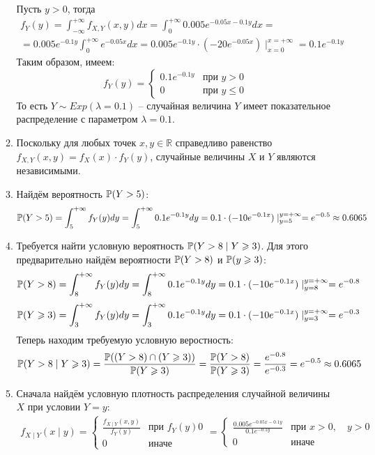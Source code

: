 \documentclass[12pt, a4paper]{article}\usepackage[]{graphicx}\usepackage[]{color}
\begin{document}
\begin{enumerate}
\begin{enumerate}
	Пусть $y > 0 $, тогда
	\begin{multline*}
	f_Y (y) = \int_{-\infty}^{+\infty} f_{X, Y} (x, y) dx  = \int_{0}^{+\infty} 0.005 e^{-0.05x-0.1y} dx = \\
	 = 0.005e^{-0.1y} \int_{0}^{+\infty} e^{-0.05x} dx = 0.005e^{-0.1y} \cdot \left(-20e^{-0.05x} \right) \mid_{x=0}^{x=+\infty} = 0.1 e^{-0.1y}
	\end{multline*}
	Таким образом, имеем:
	\[
	f_Y (y) = \begin{cases}
	0.1 e^{-0.1y} & \text{при } y>0 \\
	0 & \text{при } y \leq 0
	\end{cases}
	\]
	То есть $Y \sim Exp(\lambda=0.1)$ – случайная величина $Y$ имеет показательное распределение с параметром $\lambda = 0.1$.
	\item Поскольку для любых точек $x, y \in \mathbb{R}$ справедливо равенство $f_{X, Y} (x, y) = f_X (x) \cdot f_Y (y)$, случайные величины $X$ и $Y$ являются независимыми.
	\item Найдём вероятность $\P(Y>5)$:
	\[
	\P(Y>5) = \int_{5}^{+\infty} f_Y (y) dy = \int_{5}^{+\infty}  0.1 e^{-0.1y} dy = 0.1 \cdot (-10 e^{-0.1x}) \mid_{y=5}^{y=+\infty} = e^{-0.5} \approx0.6065  
	\]
	\item Требуется найти условную вероятность $\P(Y>8 \mid Y \geq 3)$. Для этого предварительно найдём вероятности $\P(Y>8)$ и $\P(y \geq 3)$:
	\[
	\P(Y>8) = \int_{8}^{+\infty} f_Y (y) dy  = \int_{8}^{+\infty}  0.1 e^{-0.1y} dy = 0.1 \cdot (-10 e^{-0.1x}) \mid_{y=8}^{y=+\infty} = e^{-0.8}
	\]
	\[
	\P(Y \geq 3) =  \int_{3}^{+\infty} f_Y (y) dy   = \int_{3}^{+\infty}  0.1 e^{-0.1y} dy = 0.1 \cdot (-10 e^{-0.1x}) \mid_{y=3}^{y=+\infty} = e^{-0.3}
	\]
	Теперь находим требуемую условную веростность:
	\[
	\P(Y>8 \mid Y \geq 3) = \frac{\P((Y > 8) \cap
		(Y \geq 3))}{\P(Y \geq 3)} = \frac{\P(Y>8)}{\P(Y \geq 3) } = \frac{e^{-0.8}}{e^{-0.3}} = e^{-0.5} \approx0.6065 
	\]
	\item Сначала найдём условную плотность распределения случайной величины $X$ при условии $Y=y$:
	\begin{multline*}
	f_{X \mid Y} (x \mid y) = \begin{cases}
	\frac{f_{X \mid Y} (x, y)}{f_Y (y)} & \text{при } f_Y (y) 0 \\
	0 & \text{иначе}
	\end{cases} = 
	\begin{cases}
	\frac{0.005e^{-0.05x-0.1y}}{0.1e^{-0.1y}} & \text{при } x>0, \quad y>0 \\
	0 & \text{иначе}

\end{cases}
\end{multline*}
\end{enumerate}
\end{enumerate}
\end{document}
